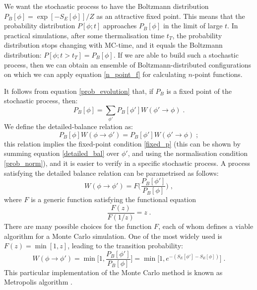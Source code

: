 We want the stochastic process to have the Boltzmann distribution $P_B[\phi] = \exp[-S_E[\phi]]/Z$ as an attractive fixed point. This means that the probability distribution $P[\phi; t]$ approaches $P_B[\phi]$ in the limit of large $t$. In practical simulations, after some thermalisation time $t_T$, the probability distribution stops changing with MC-time, and it equals the Boltzmann distribution: $P[\phi; t>t_T] = P_B[\phi]$. If we are able to build such a stochastic process, then we can obtain an ensemble of Boltzmann-distributed configurations on which we can apply equation \ref{n_point_f} for calculating $n$-point functions.

It follows from equation \ref{prob_evolution} that, if $P_B$ is a fixed point of the stochastic process, then:
\begin{equation}
P_B[\phi] = \sum_{\phi'} P_B[\phi'] W(\phi' \to \phi) \; .
\label{fixed_p}
\end{equation}
%
We define the detailed-balance relation as:
\begin{equation}
P_B[\phi] W(\phi \to \phi') = P_B[\phi'] W(\phi' \to \phi) \; ;
\label{detailed_bal}
\end{equation}
%
this relation implies the fixed-point condition \ref{fixed_p} (this can be shown by summing equation \ref{detailed_bal} over $\phi'$, and using the normalisation condition \ref{prob_norm}), and it is easier to verify in a specific stochastic process. A process satisfying the detailed balance relation can be parametrised as follows:
\begin{equation}
W(\phi \to \phi') = F\biggl(\frac{P_B[\phi']}{P_B[\phi]} \biggr) \; ,
\label{F1}
\end{equation}
%
where $F$ is a generic function satisfying the functional equation
\begin{equation}
\frac{F(z)}{F(1/z)} = z \; .
\label{F2}
\end{equation}
%
There are many possible choices for the function $F$, each of whom defines a viable algorithm for a Monte Carlo simulation. One of the most widely used is $F(z) = \min [1,z]$, leading to the transition probability:
\begin{equation}
W(\phi \to \phi') = \min\biggl[1, \frac{P_B[\phi']}{P_B[\phi]}\biggl] = \min\bigl[1,e^{-(S_E[\phi'] - S_E[\phi])}\bigr] \; .
\label{Metropolis}
\end{equation}
%
This particular implementation of the Monte Carlo method is known as Metropolis algorithm \cite{Metropolis:1953am}.

